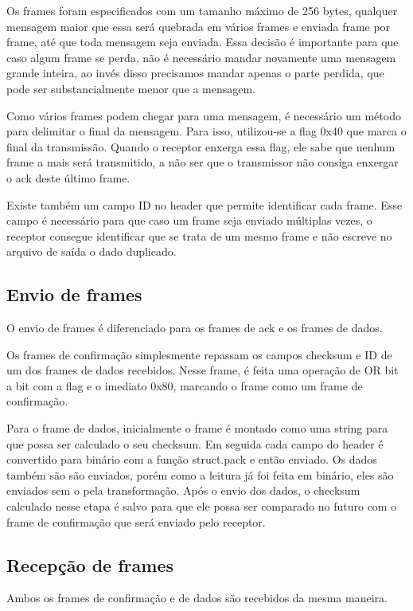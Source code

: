 \documentclass[a4paper,10pt]{article}
\begin{document}
  Os frames foram especificados com um tamanho máximo de 256 bytes, qualquer
  mensagem maior que essa será quebrada em vários frames e enviada frame
  por frame, até que toda mensagem seja enviada. Essa decisão é importante
  para que caso algum frame se perda, não é necessário mandar novamente
  uma mensagem grande inteira, ao invés disso precisamos mandar apenas o
  parte perdida, que pode ser substancialmente menor que a mensagem.

  Como vários frames podem chegar para uma mensagem, é necessário um método
  para delimitar o final da mensagem. Para isso, utilizou-se a flag 0x40
  que marca o final da transmissão. Quando o receptor enxerga essa flag,
  ele sabe que nenhum frame a mais será transmitido, a não ser que o
  transmissor não consiga enxergar o ack deste último frame.

  Existe também um campo ID no header que permite identificar cada frame.
  Esse campo é necessário para que caso um frame seja enviado múltiplas vezes,
  o receptor consegue identificar que se trata de um mesmo frame e não escreve
  no arquivo de saída o dado duplicado.

\subsection{Envio de frames}
  O envio de frames é diferenciado para os frames de ack e os frames de dados.

  Os frames de confirmação simplesmente repassam os campos checksum e ID
  de um dos frames de dados recebidos. Nesse frame, é feita uma operação de 
  OR bit a bit com a flag e o imediato 0x80, marcando o frame como um frame
  de confirmação.

  Para o frame de dados, inicialmente o frame é montado como uma string para
  que possa ser calculado o seu checksum. Em seguida cada campo do header
  é convertido para binário com a função struct.pack e então enviado.
  Os dados também são são enviados, porém como a leitura já foi feita
  em binário, eles são enviados sem o pela transformação. Após o envio
  dos dados, o checksum calculado nesse etapa é salvo para que ele possa
  ser comparado no futuro com o frame de confirmação que será enviado pelo
  receptor.

\subsection{Recepção de frames}
  Ambos os frames de confirmação e de dados são recebidos da mesma maneira.
\end{document}
